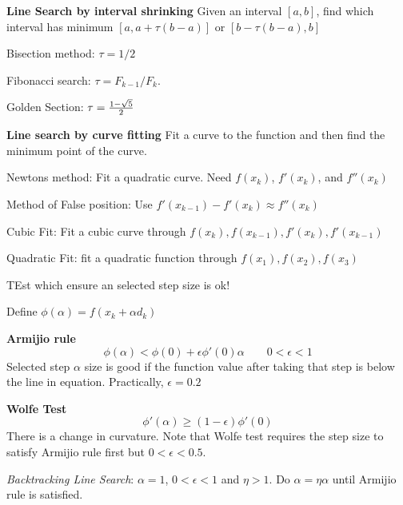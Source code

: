 \begin{slide}
\begin{list}{}{\setlength{}}
\item \textbf{Line Search by interval shrinking}
	Given an interval $[a,b]$, find which interval has minimum $[a,a+\tau(b-a)]$ or $[b-\tau(b-a),b]$
	\item Bisection method: $\tau = 1/2$
	\item Fibonacci search: $\tau = {F_{k-1}/F_k}$.
	\item Golden Section: $\tau = {1-\sqrt{5} \over 2}$
\item \textbf{Line search by curve fitting}
	Fit a curve to the function and then find the minimum point of the curve.
	\item Newtons method: Fit a quadratic curve. Need $f(x_k)$, $f'(x_k)$, and $f''(x_k)$
	\item Method of False position: Use $f'(x_{k-1}) - f'(x_k) \approx f''(x_k)$
	\item Cubic Fit: Fit a cubic curve through  $f(x_k), f(x_{k-1}),f'(x_k), f'(x_{k-1})$
	\item Quadratic Fit: fit a quadratic function through $f(x_1),f(x_2), f(x_3)$
\end{list}
\end{slide}
\begin{slide}
	TEst which ensure an selected step size is ok!

	Define $\phi(\alpha) = f(x_k +\alpha d_k)$

	\textbf{Armijio rule}
		$$\phi(\alpha) < \phi(0) + \epsilon \phi'(0)\alpha \qquad 0<\epsilon<1$$
		Selected step $\alpha$ size is good if the function value after taking that step is below the line in equation. Practically, $\epsilon = 0.2$
	
	\textbf{Wolfe Test}
		$$\phi'(\alpha) \geq (1-\epsilon)\phi'(0)$$
			There is a change in curvature. Note that Wolfe test requires the step size to satisfy Armijio rule first but $0<\epsilon<0.5.$

	\textit{Backtracking Line Search}: $\alpha = 1$, $0<\epsilon<1$ and $\eta>1$. Do $\alpha = \eta \alpha$ until Armijio rule is satisfied.
\end{slide}

